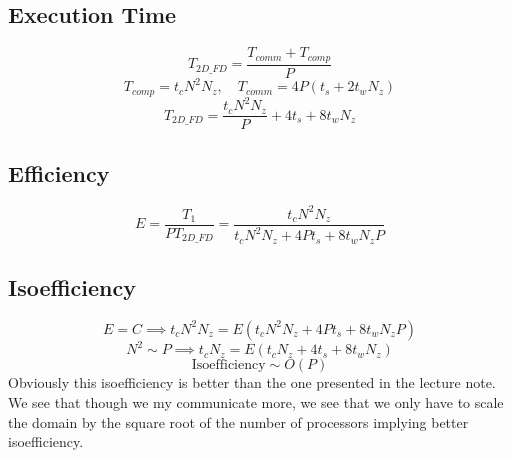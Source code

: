 \documentclass{article}
\begin{document}
    \subsection{\textbf{Execution Time}}
    \[
        T_{2D\_FD} = \frac{T_{comm} + T_{comp}}{P}
    \]
    \[
        T_{comp} = t_c N^2N_z, \quad T_{comm} = 4P(t_s + 2t_wN_z)
    \]
    \[
        T_{2D\_FD} = \frac{t_cN^2N_z}{P} + 4t_s + 8t_wN_z
    \]
    \subsection{\textbf{Efficiency}}
    \[
        E = \frac{T_1}{PT_{2D\_FD}} = \frac{t_cN^2N_z}{t_cN^2N_z + 4Pt_s + 8t_wN_zP}
    \]

    \subsection{\textbf{Isoefficiency}}
    \[
        E = C \implies t_cN^2N_z = E(t_cN^2N_z + 4Pt_s + 8t_wN_zP)
    \]
    \[
        N^2 \sim P \implies t_cN_z = E(t_cN_z + 4t_s + 8t_wN_z)
    \]
    \[
        \text{Isoefficiency} \sim O(P)
    \]
    Obviously this isoefficiency is better than the one presented in the lecture
    note. We see that though we my communicate more, we see that we only have to
    scale the domain by the square root of the number of processors implying
    better isoefficiency. 
\end{document}
